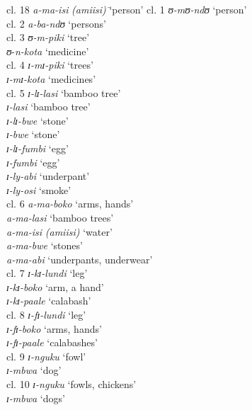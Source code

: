 \documentclass[output=paper]{langscibook}
\begin{document}
\ea%
    \label{ex:lusekelo:1}
\begin{tabbing}
    cl. 18 \=  \textit{a-ma-isi} \textit{(amiisi)}  \= ‘person’   \kill
    cl. 1 \> \textit{ʊ{}-mʊ{}-ndʊ} \> ‘person’     \\
  cl. 2 \> \textit{a-ba-ndʊ} \> ‘persons’\\
  cl. 3 \> \textit{ʊ{}-m-piki} \> ‘tree’  \\
    \> \textit{ʊ}{}-\textit{n-kota} \>  ‘medicine’\\
  cl. 4 \> \textit{ɪ{}-mɪ{}-piki} \> ‘trees’   \\
    \> \textit{ɪ{}-mɪ{}-kota} \>  ‘medicines’\\
  cl. 5  \> \textit{ɪ{}-lɪ{}-lasi} \> ‘bamboo tree’\\
    \> \textit{ɪ{}-lasi} \> ‘bamboo tree’  \\
    \> \textit{ɪ{}-lɪ{}-bwe} \> ‘stone’   \\
   \> \textit{ɪ{}-bwe} \> ‘stone’   \\
   \> \textit{ɪ{}-lɪ{}-fumbi} \> ‘egg’   \\
   \> \textit{ɪ{}-fumbi} \> ‘egg’\\
    \> \textit{ɪ{}-ly-abi} \> ‘underpant’ \\
   \> \textit{ɪ{}-ly-osi} \> ‘smoke’ \\
  cl. 6  \> \textit{a-ma-boko} \> ‘arms, hands’  \\
   \> \textit{a-ma-lasi} \> ‘bamboo trees’\\
   \> \textit{a-ma-isi} \textit{(amiisi)} \> ‘water’ \\
   \> \textit{a-ma-bwe} \> ‘stones’   \\
   \> \textit{a-ma-abi} \> ‘underpants, underwear’  \\
  cl. 7 \> \textit{ɪ{}-kɪ{}-lundi} \> ‘leg’ \\
   \> \textit{ɪ{}-kɪ{}-boko} \> ‘arm, a hand’  \\
   \> \textit{ɪ{}-kɪ{}-paale} \> ‘calabash’     \\
  cl. 8 \> \textit{ɪ{}-fɪ{}-lundi} \> ‘leg’ \\
   \> \textit{ɪ{}-fɪ{}-boko} \> ‘arms, hands’ \\
   \> \textit{ɪ{}-fɪ{}-paale} \> ‘calabashes’\\
  cl. 9 \> \textit{ɪ{}-nguku} \> ‘fowl’ \\
   \> \textit{ɪ{}-mbwa} \> ‘dog’ \\
  cl. 10 \> \textit{ɪ{}-nguku} \> ‘fowls, chickens’ \\
   \> \textit{ɪ{}-mbwa} \> ‘dogs’ \\

\end{tabbing}
\end{document}
